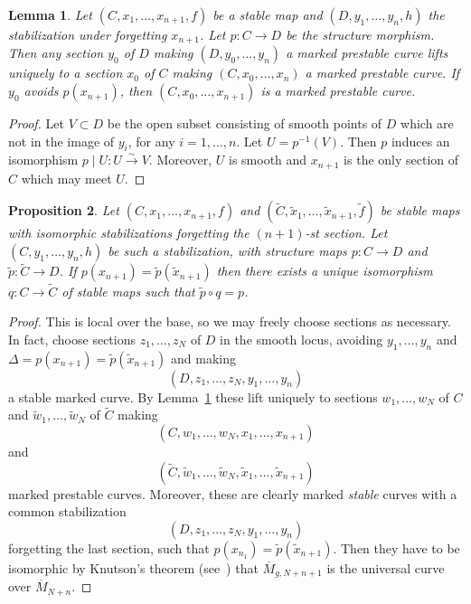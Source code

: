 \documentclass[11pt]{amsart}
\newtheorem{prop}{Proposition}[section]
\newtheorem{lem}[prop]{Lemma}
\theoremstyle{definition}
\theoremstyle{remark}
\newenvironment{pf}{\begin{proof}}{\end{proof}}
\renewcommand{\tilde}{\widetilde}
\newcommand{\resto}{{ \mid }}
\newcommand{\comp}{\mathbin{{\scriptstyle\circ}}}
\newcommand{\ol}{\overline}
\newcommand{\iso}{\stackrel{\sim}{\rightarrow}}
\theoremstyle{plain}
\theoremstyle{definition}
\theoremstyle{remark}
\begin{document}
\begin{lem} \label{lalss}
Let \((C,x_1,\ldots,x_{n+1},f)\) be a stable map and \((D,y_1,\ldots,y_n,h)\) the
stabilization under forgetting \(x_{n+1}\).
Let \(p:C\rightarrow D\) be the structure morphism. Then any section \(y_0\) of \(D\)
making \((D,y_0,\ldots,y_n)\) a marked
prestable curve lifts uniquely to a section \(x_0\) of \(C\) making
\((C,x_0,\ldots,x_n)\) a marked prestable curve. If \(y_0\)
avoids \(p(x_{n+1})\), then \((C,x_0,\ldots,x_{n+1})\) is a marked prestable curve.
\end{lem}
\begin{pf}
Let \(V\subset D\) be the open subset consisting of smooth points of \(D\) which
are not in the image of \(y_i\), for any
\(i=1,\ldots,n\). Let \(U=p^{-1}(V)\). Then \(p\) induces an isomorphism \(p\resto
U:U\iso V\). Moreover, \(U\) is smooth and
\(x_{n+1}\) is the only section of \(C\) which may meet \(U\).
\end{pf}

\begin{prop} \label{uors}
Let \((C,x_1,\ldots,x_{n+1},f)\) and
\((\tilde{C},\tilde{x}_1,\ldots,\tilde{x}_{n+1},\tilde{f})\) be stable maps with
isomorphic stabilizations forgetting the \((n+1)\)-st section. Let
\((C,y_1,\ldots,y_n,h)\) be such a stabilization, with
structure maps \(p:C\rightarrow D\) and \(\tilde{p}:\tilde{C}\rightarrow D\). If
\(p(x_{n+1})=\tilde{p}(\tilde{x}_{n+1})\)
then there exists a unique isomorphism \(q:C\rightarrow\tilde{C}\) of stable maps
such that \(\tilde{p}\comp q=p\).
\end{prop}
\begin{pf}
This is local over the base, so we may freely choose sections as necessary. In
fact, choose sections \(z_1,\ldots,z_N\) of
\(D\) in the smooth locus, avoiding \(y_1,\ldots,y_n\) and
\(\Delta=p(x_{n+1})=\tilde{p}(\tilde{x}_{n+1})\) and making
\[
(D,z_1,\ldots,z_N,y_1,\ldots,y_n)
\]
a stable marked curve. By
Lemma~\ref{lalss} these lift uniquely to sections
\(w_1,\ldots,w_N\) of \(C\) and \(\tilde{w}_1,\ldots,\tilde{w}_N\) of \(\tilde{C}\)
making
\[
(C,w_1,\ldots,w_N,x_1,\ldots,x_{n+1})
\]
and
\[
(\tilde{C},\tilde{w}_1,\ldots,\tilde{w}_N,\tilde{x}_1,
\ldots,\tilde{x}_{n+1})
\]
marked prestable curves. Moreover,
these are clearly marked {\em stable } curves with a common stabilization
\[
(D,z_1,\ldots,z_N,y_1,\ldots,y_n)
\]
forgetting
the last section, such that \(p(x_{n_1})=\tilde{p}(\tilde{x}_{n+1})\). Then they
have to be isomorphic by Knutson's theorem
(see~\cite{knudsen}) that \(\ol{M}_{g,N+n+1}\) is the universal curve over
\(\ol{M}_{N+n}\).
\end{pf}
\end{document}

